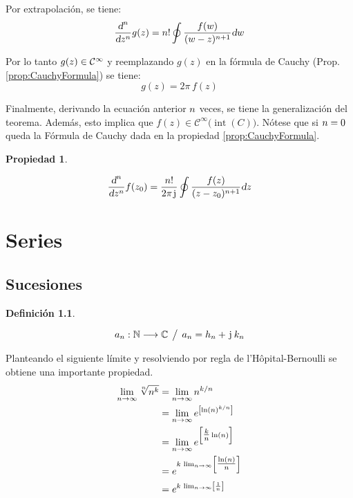 \documentclass[a5paper,12pt,twoside]{book}
\newtheorem{defn}{{Definición}}[chapter]
\newtheorem{prop}{{Propiedad}}[chapter]
\begin{document}
Por extrapolación, se tiene:
\begin{equation*}
    \frac{\dif^\nth}{\dif z^\nth} g(z) = \nth! \oint \frac{f(w)}{(w-z)^{\nth+1}} \dif w
\end{equation*}

Por lo tanto $g(z) \in \class[\infty]$ y reemplazando $g(z)$ en la fórmula de Cauchy (Prop. \ref{prop:CauchyFormula}) se tiene:
\begin{equation*}
    g(z) = 2 \pi \, f(z)
\end{equation*}

Finalmente, derivando la ecuación anterior $\nth$ veces, se tiene la generalización del teorema.
Además, esto implica que $f(z) \in \mathcal{C} ^ \infty \big( \operatorname{int}(C) \big)$.
Nótese que si $\nth=0$ queda la Fórmula de Cauchy dada en la propiedad \ref{prop:CauchyFormula}.

\begin{mdframed}[style=PropertyFrame]
    \begin{prop}
    \end{prop}
    \begin{equation*}
        \frac{\dif^\nth}{\dif z^\nth} f(z_0) = \frac{\nth!}{2 \pi \iu} \oint \frac{f(z)}{(z-z_0)^{\nth+1}} \dif z
    \end{equation*}
\end{mdframed}


\chapter{Series}


\section{Sucesiones}

\begin{mdframed}[style=DefinitionFrame]
    \begin{defn}
    \end{defn}
    \begin{equation*}
        a_\nth: \setN \longrightarrow \setC \tq a_\nth = h_\nth + \iu \, k_\nth
    \end{equation*}
\end{mdframed}

Planteando el siguiente límite y resolviendo por regla de l'Hôpital-Bernoulli se obtiene una importante propiedad.
\begin{align*}
    \lim_{\nth\to\infty} \sqrt[\nth]{\nth^\kth}
    &= \lim_{\nth\to\infty} \nth^{\kth/\nth}
    \\
    &= \lim_{\nth\to\infty} e^{\left[ \ln(\nth)^{\kth/\nth} \right]}
    \\
    &= \lim_{n\to\infty} e^{\left[ \tfrac{\kth}{\nth} \ln(n) \right]}
    \\
    &= e^{\kth \, \lim_{\nth\to\infty} \left[ \tfrac{\ln(\nth)}{\nth} \right]}
    \\
    &= e^{\kth \, \lim_{\nth\to\infty} \left[ \frac{1}{\nth} \right]}
\end{align*}
\end{document}

